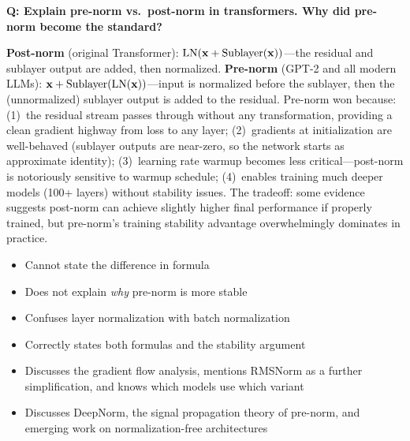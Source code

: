 \bigskip

\begin{interviewq}
\textbf{Q: Explain pre-norm vs.\ post-norm in transformers. Why did pre-norm become
the standard?}

 \quad {} \quad \badgefreq{\freqmed}

\stronganswer
\textbf{Post-norm} (original Transformer): $\text{LN}(\mathbf{x} + \text{Sublayer}(\mathbf{x}))$---the
residual and sublayer output are added, then normalized.  \textbf{Pre-norm}
(GPT-2 and all modern LLMs): $\mathbf{x} + \text{Sublayer}(\text{LN}(\mathbf{x}))$---input
is normalized before the sublayer, then the (unnormalized) sublayer output is
added to the residual.  Pre-norm won because: (1)~the residual stream passes
through without any transformation, providing a clean gradient highway from
loss to any layer; (2)~gradients at initialization are well-behaved (sublayer
outputs are near-zero, so the network starts as approximate identity);
(3)~learning rate warmup becomes less critical---post-norm is notoriously
sensitive to warmup schedule; (4)~enables training much deeper models
(100+ layers) without stability issues.  The tradeoff: some evidence suggests
post-norm can achieve slightly higher final performance if properly trained,
but pre-norm's training stability advantage overwhelmingly dominates in practice.

\redflags
\begin{itemize}
    \item Cannot state the difference in formula
    \item Does not explain \emph{why} pre-norm is more stable
    \item Confuses layer normalization with batch normalization
\end{itemize}


\goodgreat
\begin{itemize}
    \item {} Correctly states both formulas and the stability argument
    \item {} Discusses the gradient flow analysis, mentions RMSNorm
          as a further simplification, and knows which models use which variant
    \item {} Discusses DeepNorm, the signal propagation theory of
          pre-norm, and emerging work on normalization-free architectures
\end{itemize}

\end{interviewq}

